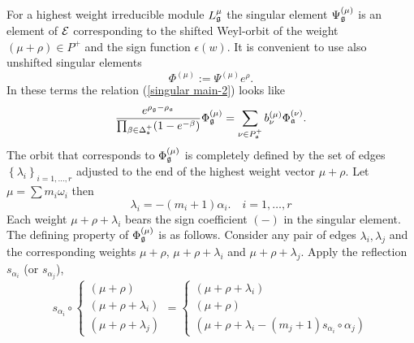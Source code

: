 \documentclass[12pt]{article}
\begin{document}
For a highest weight irreducible module $L^{\mu}_{\frak{g}}$ the singular element $\Psi_{\frak{g}} ^{\left( \mu \right) }$ is an element of $\cal{E}$ corresponding to the shifted Weyl-orbit of the weight $\left( \mu + \rho \right) \in P^+$ and the sign function $\epsilon\left( w \right)$. It is convenient to use also unshifted singular elements  
\begin{equation}
 \Phi^{\left( \mu \right)}:= \Psi^{\left( \mu \right) }e^{\rho}.
 \label{definition Phi}
\end{equation}
In these terms the relation (\ref{singular main-2}) looks like
\begin{equation}
 \frac{e^{\rho_{\frak{g}}-\rho_{\frak{a}}}}{\prod_{\beta \in \Delta_{\frak{s}} ^{+}}(1-e^{-\beta })}\Phi_{\frak{g}} ^{\left( \mu \right) }
=
\sum_{\nu \in P_{\frak{a}}^{+}}b_{\nu }^{(\mu )}\Phi _{\frak{a}%
}^{\left( \nu \right) }.
\label{singular main-3}
\end{equation}
The orbit that corresponds to $\Phi_{\frak{g}} ^{\left( \mu \right) }$ is completely defined by 
the set of edges $\left\{ \lambda_{i}\right\}_{i=1,\dots,r}$ adjusted to the end of the highest weight vector $\mu + \rho$. Let $\mu=\sum m_i \omega_i$ then 
\begin{equation}
 \lambda_i=-\left( m_i +1\right)\alpha_i .\quad i=1,\dots,r
\label{edge}
\end{equation}
Each weight $\mu + \rho + \lambda_i $ bears the sign coefficient $(-)$ in the singular element. The defining property of $\Phi_{\frak{g}} ^{\left( \mu \right) }$ is as follows. Consider any pair of edges $\lambda_i,\lambda_j$ and the corresponding weights $\mu + \rho $, $\mu + \rho + \lambda_i $ and $\mu + \rho + \lambda_j $. Apply the reflection $s_{\alpha_i}$ (or $s_{\alpha_j}$),  
\begin{equation}
 s_{\alpha_i}\circ
 \left\{
\begin{array}{l}
\left( \mu + \rho  \right)\\
\left( \mu + \rho + \lambda_i \right)\\
\left( \mu + \rho + \lambda_j \right)
 \end{array}
\right.
= 
  \left\{
\begin{array}{l}
\left( \mu + \rho + \lambda_i \right)\\
\left( \mu + \rho  \right)\\
\left( \mu + \rho + \lambda_i -  (m_j + 1) s_{\alpha_i}\circ \alpha_j\right)
 \end{array}
\right.
 \label{reflected triple}
\end{equation}
\end{document}
